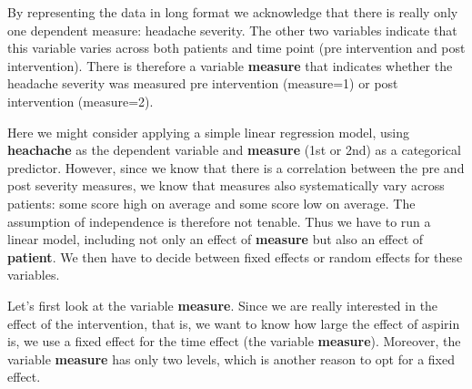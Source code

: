 \documentclass[]{book}\usepackage[]{graphicx}\usepackage[]{color}
\begin{document}
By representing the data in long format we acknowledge that there is really only one dependent measure: headache severity. The other two variables indicate that this variable varies across both patients and time point (pre intervention and post intervention). There is therefore a variable \textbf{measure} that indicates whether the headache severity was measured pre intervention (measure=1) or post intervention (measure=2). 

Here we might consider applying a simple linear regression model, using \textbf{heachache} as the dependent variable and \textbf{measure} (1st or 2nd) as a categorical predictor. However, since we know that there is a correlation between the pre and post severity measures, we know that measures also systematically vary across patients: some score high on average and some score low on average. The assumption of independence is therefore not tenable. Thus we have to run a linear model, including not only an effect of \textbf{measure} but also an effect of \textbf{patient}. We then have to decide between fixed effects or random effects for these variables. 

Let's first look at the variable \textbf{measure}. Since we are really interested in the effect of the intervention, that is, we want to know how large the effect of aspirin is, we use a fixed effect for the time effect (the variable \textbf{measure}). Moreover, the variable \textbf{measure} has only two levels, which is another reason to opt for a fixed effect. 
\end{document}
